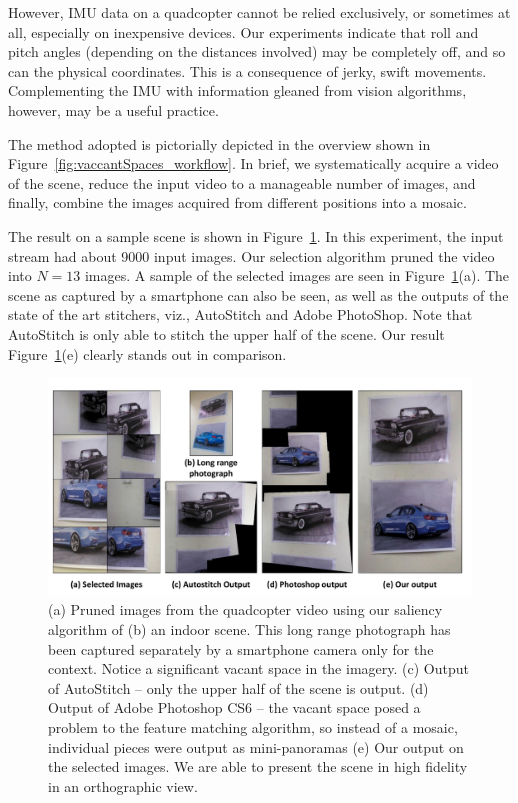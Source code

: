 However, IMU data on a quadcopter cannot be relied exclusively, or sometimes at
all, especially on inexpensive devices. Our experiments indicate that roll
and pitch angles (depending on the distances involved) may be completely off,
and so can the physical coordinates.  This is a consequence of jerky,
swift movements.  Complementing the IMU with information gleaned from
vision algorithms, however, may be a useful practice.

The method adopted is pictorially depicted in the overview shown in
Figure~\ref{fig:vaccantSpaces_workflow}.  In
brief, we systematically acquire a video of the scene, reduce the
input video to a manageable number of images, and finally, combine the
images acquired from different positions into a mosaic. 

The result on a sample scene is shown in Figure~\ref{fig:vacantSpaces_result}.
In this experiment, the input stream had about 9000 input images.  Our selection algorithm
 pruned the video into $N=13$ images. A sample of the selected images are seen
 in Figure~\ref{fig:vacantSpaces_result}(a).  The scene as captured by a
 smartphone can also be seen, as well as the outputs of the state of the art
 stitchers, viz., AutoStitch\cite{autostitch} and Adobe
 PhotoShop\cite{photoshop}. Note that AutoStitch\cite{autostitch} is only able
 to stitch the upper half of the scene.  Our result
 Figure~\ref{fig:vacantSpaces_result}(e) clearly stands out in comparison.\\
  
  \begin{figure}[h!]
	\centering
	\includegraphics[width=0.98\linewidth]{figures/vacantSpaces/indoor_results}
	\caption[Result: Cars]{ (a) Pruned images from the quadcopter video using our
  saliency algorithm of (b) an indoor scene. This long range photograph
  has been captured separately by a smartphone camera only for the
  context. Notice a significant vacant space in the imagery.  (c)
  Output of AutoStitch -- only the upper half of the scene is output.
  (d) Output of Adobe Photoshop CS6 -- the vacant space posed a problem to the
  feature matching algorithm, so instead of a mosaic, individual
  pieces were output as mini-panoramas (e) Our output on the selected
  images. We are able to present the scene in high fidelity in an
  orthographic view.}	
	\label{fig:vacantSpaces_result}
	\end{figure}
  
